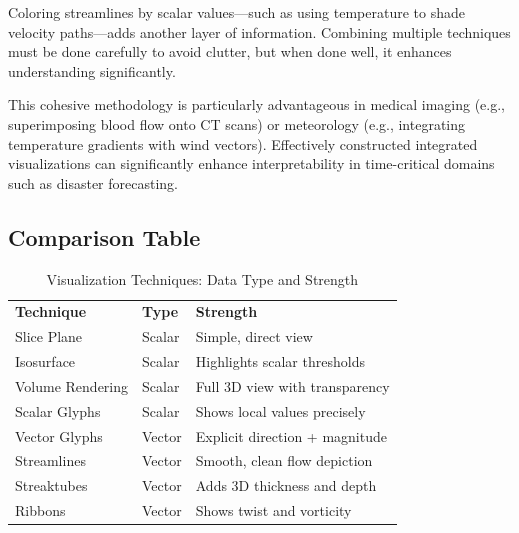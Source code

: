 \documentclass[11pt]{article}
\begin{document}
	Coloring streamlines by scalar values—such as using temperature to shade velocity paths—adds another layer of information. Combining multiple techniques must be done carefully to avoid clutter, but when done well, it enhances understanding significantly.

	This cohesive methodology is particularly advantageous in medical imaging (e.g., superimposing blood flow onto CT scans) or meteorology (e.g., integrating temperature gradients with wind vectors). Effectively constructed integrated visualizations can significantly enhance interpretability in time-critical domains such as disaster forecasting.
	
	\subsection{Comparison Table}
	
		\begin{table}[H]
		\centering
		\caption{Visualization Techniques: Data Type and Strength}
		\renewcommand{\arraystretch}{1.3}
		\begin{tabular}{|l|l|l|}
			\hline
			\textbf{Technique} & \textbf{Type} & \textbf{Strength} \\

			Slice Plane        & Scalar        & Simple, direct view \\

			Isosurface         & Scalar        & Highlights scalar thresholds \\

			Volume Rendering   & Scalar        & Full 3D view with transparency \\

			Scalar Glyphs      & Scalar        & Shows local values precisely \\

			Vector Glyphs      & Vector        & Explicit direction + magnitude \\

			Streamlines        & Vector        & Smooth, clean flow depiction \\

			Streaktubes        & Vector        & Adds 3D thickness and depth \\

			Ribbons            & Vector        & Shows twist and vorticity \\
			\hline
		\end{tabular}
	\end{table}
	
\end{document}
